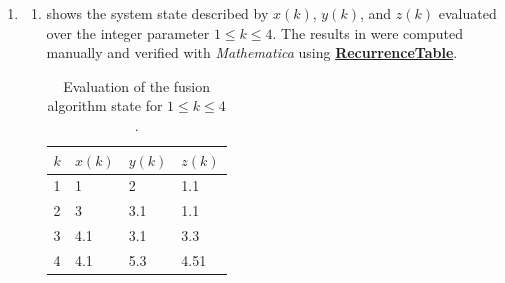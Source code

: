\documentclass{article}
\newcommand\mma[1]%
    {\href{https://reference.wolfram.com/language/ref/#1.html}{\textbf{#1}}}
\numberwithin{equation}{section}
\numberwithin{table}{section}
\numberwithin{figure}{section}
\DeclareMathOperator\mls{ms}
\DeclareMathOperator\second{s}
\begin{document}
\begin{enumerate}
\begin{enumerate}
                simultaneously retrieves processed results from (B3), prepares
                them as a UDP/IP packet in the format expected by the database
                server, and sends them over a previously established socket.
                This task is released periodically every $5\second$.
            \item \emph{GUI management.} The GUI task acts as a state machine to
                manage local interaction with the device. It performs regular
                non-blocking reads from (B4) to respond to any button presses,
                and communicates regularly with the LCD to display any requested
                information.
            \item \emph{Local storage.} The local storage task consumes
                processed results from (B2) and records them in some persistent
                storage (possibly present on the non-volatile flash or volatile
                RAM) using a known data structure. This task could be
                event-driven or have a period of $100\mls$ as it does not form
                part of the performance-critical path.
        \end{enumerate}
        \endgroup

        For the allocation and execution of these tasks, a deadline-monotonic
        scheme could be used, whereby tasks with shorter relative deadlines are
        assigned a higher priority. Choice of this scheduling scheme preserves
        the safety-critical ordering of the tasks, such as prioritising data
        acquisition to avoid missing patient data, and reduces the chances of
        buffer overflow. All inter-task communication data structures are FIFO
        thread-safe queues. Mutexes may be required to protected shared
        resources such as the local storage or network stack.
    \item \begin{enumerate}
        \item {} shows the system state described by $x(k)$,
	    $y(k)$, and $z(k)$ evaluated over the integer parameter $1 \leq k
	    \leq 4$. The results in  were computed manually
	    and verified with \emph{Mathematica} using \mma{RecurrenceTable}.
        \begin{table}
            \centering%
            \begin{tabular}{l|lll}
                $k$ & $x(k)$ & $y(k)$ & $z(k)$ \\
                \toprule
                1 & 1 & 2 & 1.1 \\
                2 & 3 & 3.1 & 1.1 \\
                3 & 4.1 & 3.1 & 3.3 \\
                4 & 4.1 & 5.3 & 4.51 \\
                \bottomrule
            \end{tabular}
            \caption{Evaluation of the fusion algorithm state for
                $1 \leq k \leq 4$.}%
            \label{table:evals}
        \end{table}%


\end{enumerate}
\end{enumerate}
\end{document}
